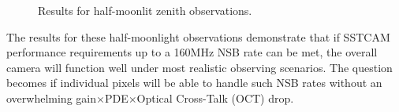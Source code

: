 \begin{figure}[ht]
\begin{minipage}{\linewidth}\centering
{}

\caption{Results for half-moonlit zenith observations.}
\label{fig:hm}

\end{minipage}
\end{figure}
The results for these half-moonlight observations demonstrate that if SSTCAM performance requirements up to a 160MHz NSB rate can be met, the overall camera will function well under most realistic observing scenarios. The question becomes if individual pixels will be able to handle such NSB rates without an overwhelming gain$\times$PDE$\times$Optical Cross-Talk (OCT) drop.

